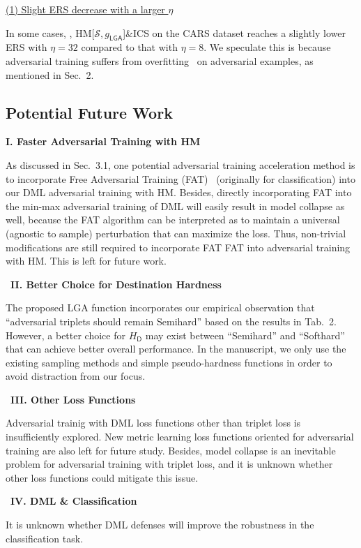 \noindent\ul{(1) Slight ERS decrease with a larger $\eta$}

In some cases, \eg, HM[$\mathcal{S},g_\mathsf{LGA}$]\&ICS on the CARS dataset
reaches a slightly lower ERS with $\eta=32$ compared to that with $\eta=8$.
%
We speculate this is because adversarial training suffers from overfitting~\cite{bagoftricks,overfitting}
on adversarial examples, as mentioned in Sec.~2.

\subsection{Potential Future Work}

\noindent\textbf{I. Faster Adversarial Training with HM}

As discussed in Sec.~3.1, one potential adversarial training acceleration
method is to incorporate Free Adversarial Training (FAT)~\cite{freeat}
(originally for classification) into our DML adversarial training with HM.
%
Besides, directly incorporating FAT into the min-max adversarial training of
DML will easily result in model collapse as well, because the FAT algorithm can
be interpreted as to maintain a universal (agnostic to sample) perturbation
that can maximize the loss.
%
Thus, non-trivial modifications are still required to incorporate FAT FAT into
adversarial training with HM. This is left for future work.

~\newline\textbf{II. Better Choice for Destination Hardness}

The proposed LGA function incorporates our empirical observation that
``adversarial triplets should remain Semihard'' based on the results in Tab.~2.
%
However, a better choice for $H_\mathsf{D}$ may exist between ``Semihard'' and
``Softhard'' that can achieve better overall performance.
%
In the manuscript, we only use the existing sampling methods and simple
pseudo-hardness functions in order to avoid distraction from our focus.

~\newline\textbf{III. Other Loss Functions}

Adversarial trainig with DML loss functions other than triplet loss is
insufficiently explored.
%
New metric learning loss functions oriented for adversarial training are also
left for future study.
%
Besides, model collapse is an inevitable problem for adversarial training
with triplet loss, and it is unknown whether other loss functions could
mitigate this issue.

~\newline\textbf{IV. DML \& Classification}

It is unknown whether DML defenses will improve the robustness in the
classification task.

